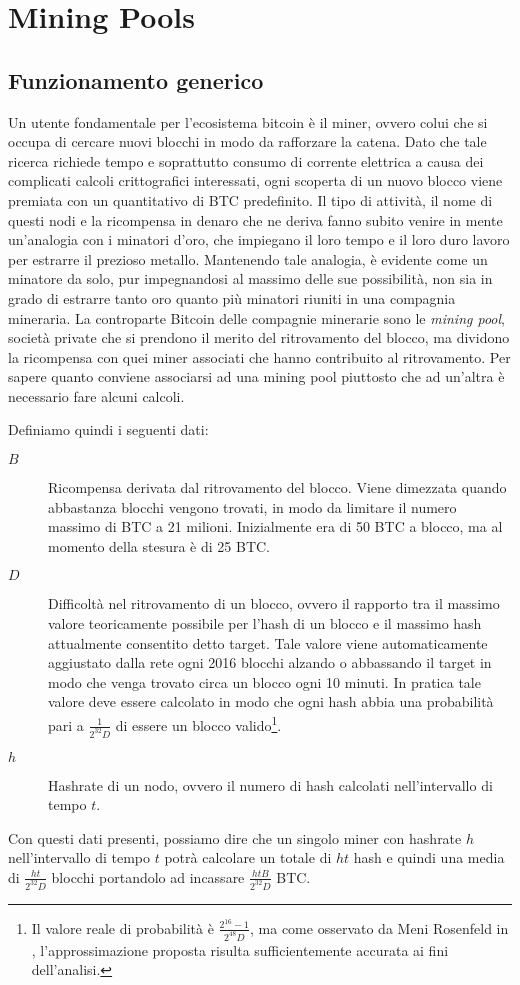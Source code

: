 \chapter{Mining Pools}\label{mining-pool}

\section{Funzionamento generico}

Un utente fondamentale per l'ecosistema bitcoin è il miner, ovvero colui che si occupa di cercare nuovi blocchi in modo da rafforzare la catena. Dato che tale ricerca richiede tempo e soprattutto consumo di corrente elettrica a causa dei complicati calcoli crittografici interessati, ogni scoperta di un nuovo blocco viene premiata con un quantitativo di BTC predefinito.
Il tipo di attività, il nome di questi nodi e la ricompensa in denaro che ne deriva fanno subito venire in mente un'analogia con i minatori d'oro, che impiegano il loro tempo e il loro duro lavoro per estrarre il prezioso metallo.
Mantenendo tale analogia, è evidente come un minatore da solo, pur impegnandosi al massimo delle sue possibilità, non sia in grado di estrarre tanto oro quanto più minatori riuniti in una compagnia mineraria. La controparte Bitcoin delle compagnie minerarie sono le \emph{mining pool}, società private che si prendono il merito del ritrovamento del blocco, ma dividono la ricompensa con quei miner associati che hanno contribuito al ritrovamento.
Per sapere quanto conviene associarsi ad una mining pool piuttosto che ad un'altra è necessario fare alcuni calcoli.

Definiamo quindi i seguenti dati:
\begin{description}
    \item[$B$] Ricompensa derivata dal ritrovamento del blocco. Viene dimezzata quando abbastanza blocchi vengono trovati, in modo da limitare il numero massimo di BTC a 21 milioni. Inizialmente era di 50 BTC a blocco, ma al momento della stesura è di 25 BTC.
    \item[$D$] Difficoltà nel ritrovamento di un blocco, ovvero il rapporto tra il massimo valore teoricamente possibile per l'hash di un blocco e il massimo hash attualmente consentito detto target. Tale valore viene automaticamente aggiustato dalla rete ogni 2016 blocchi alzando o abbassando il target in modo che venga trovato circa un blocco ogni 10 minuti. In pratica tale valore deve essere calcolato in modo che ogni hash abbia una probabilità pari a $\frac{1}{2^{32} D}$ di essere un blocco valido\footnote{Il valore reale di probabilità è $\frac{2^{16} - 1}{2^{48} D}$, ma come osservato da Meni Rosenfeld in \cite{pool-analysis}, l'approssimazione proposta risulta sufficientemente accurata ai fini dell'analisi.}.
    \item[$h$] Hashrate di un nodo, ovvero il numero di hash calcolati nell'intervallo di tempo $t$.
\end{description}
Con questi dati presenti, possiamo dire che un singolo miner con hashrate $h$ nell'intervallo di tempo $t$ potrà calcolare un totale di $ht$ hash e quindi una media di $\frac{ht}{2^{32}D}$ blocchi portandolo ad incassare $\frac{htB}{2^{32} D}$ BTC.

